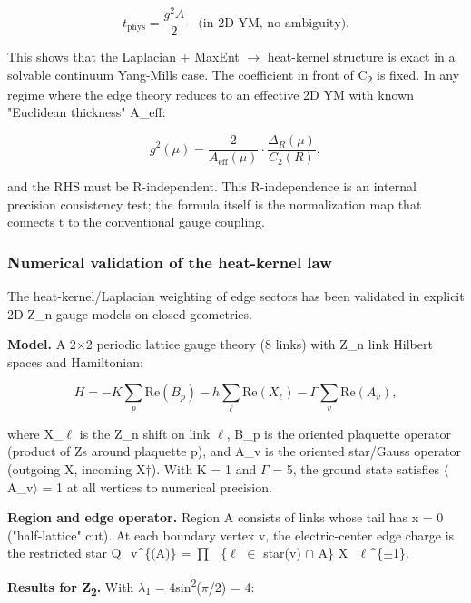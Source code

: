 \[
t_\mathrm{phys} = \frac{g^2 A}{2} \quad \text{(in 2D YM, no ambiguity).}
\]

This shows that the Laplacian + MaxEnt \ensuremath{\to} heat-kernel structure is exact in a solvable continuum Yang-Mills case. The coefficient in front of C\textsubscript{2} is fixed. In any regime where the edge theory reduces to an effective 2D YM with known "Euclidean thickness" A\_eff:

\[
g^2(\mu) = \frac{2}{A_\mathrm{eff}(\mu)} \cdot \frac{\Delta_R(\mu)}{C_2(R)},
\]

and the RHS must be R-independent. This R-independence is an internal precision consistency test; the formula itself is the normalization map that connects t to the conventional gauge coupling.

\subsubsection{Numerical validation of the heat-kernel law}\label{614-numerical-validation-of-the-heat-kernel-law}

The heat-kernel/Laplacian weighting of edge sectors has been validated in explicit 2D Z\_n gauge models on closed geometries.

\textbf{Model.} A 2\ensuremath{\times}2 periodic lattice gauge theory (8 links) with Z\_n link Hilbert spaces and Hamiltonian:

\[
H = -K \sum_p \mathrm{Re}(B_p) - h \sum_\ell \mathrm{Re}(X_\ell) - \Gamma \sum_v \mathrm{Re}(A_v),
\]

where X\_\ensuremath{\ell} is the Z\_n shift on link \ensuremath{\ell}, B\_p is the oriented plaquette operator (product of Z\textquotesingle s around plaquette p), and A\_v is the oriented star/Gauss operator (outgoing X, incoming X\ensuremath{\dagger}). With K = 1 and \ensuremath{\Gamma} = 5, the ground state satisfies \ensuremath{\langle}A\_v\ensuremath{\rangle} = 1 at all vertices to numerical precision.

\textbf{Region and edge operator.} Region A consists of links whose tail has x = 0 ("half-lattice" cut). At each boundary vertex v, the electric-center edge charge is the restricted star Q\_v\^{}\{(A)\} = \ensuremath{\prod}\_\{\ensuremath{\ell} \ensuremath{\in} star(v) \ensuremath{\cap} A\} X\_\ensuremath{\ell}\^{}\{\ensuremath{\pm}1\}.

\textbf{Results for Z\textsubscript{2}.} With \ensuremath{\lambda}\textsubscript{1} = 4sin\textsuperscript{2}(\ensuremath{\pi}/2) = 4:

